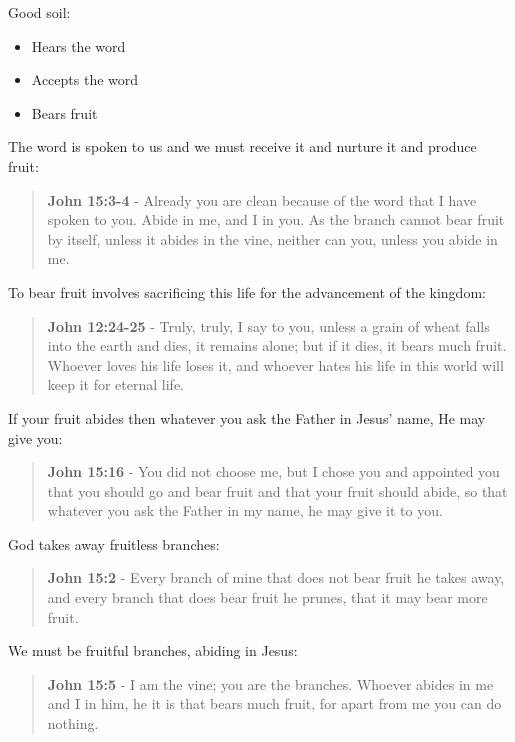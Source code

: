 \documentclass[11pt]{article}
\begin{document}
Good soil:
\begin{itemize}
\item Hears the word
\item Accepts the word
\item Bears fruit
\end{itemize}

The word is spoken to us and we must receive it and nurture it and produce fruit:

\begin{quote}
\textbf{John 15:3-4} - Already you are clean because of the word that I have spoken to you. Abide in me, and I in you. As the branch cannot bear fruit by itself, unless it abides in the vine, neither can you, unless you abide in me.
\end{quote}

To bear fruit involves sacrificing this life for the advancement of the kingdom:

\begin{quote}
\textbf{John 12:24-25} - Truly, truly, I say to you, unless a grain of wheat falls into the earth and dies, it remains alone; but if it dies, it bears much fruit. Whoever loves his life loses it, and whoever hates his life in this world will keep it for eternal life.
\end{quote}

If your fruit abides then whatever you ask the Father in Jesus' name, He may give you:

\begin{quote}
\textbf{John 15:16} - You did not choose me, but I chose you and appointed you that you should go and bear fruit and that your fruit should abide, so that whatever you ask the Father in my name, he may give it to you.
\end{quote}

God takes away fruitless branches:

\begin{quote}
\textbf{John 15:2} - Every branch of mine that does not bear fruit he takes away, and every branch that does bear fruit he prunes, that it may bear more fruit.
\end{quote}

We must be fruitful branches, abiding in Jesus:

\begin{quote}
\textbf{John 15:5} - I am the vine; you are the branches. Whoever abides in me and I in him, he it is that bears much fruit, for apart from me you can do nothing.
\end{quote}
\end{document}
